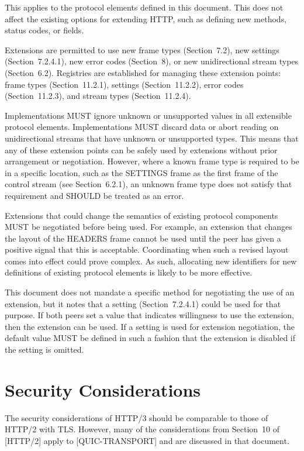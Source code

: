 \documentclass{article}
\begin{document}
This applies to the protocol elements defined in this document.  This does not affect the existing options for extending HTTP, such as defining new methods, status codes, or fields.

Extensions are permitted to use new frame types (Section~7.2), new settings (Section~7.2.4.1), new error codes (Section~8), or new unidirectional stream types (Section~6.2).  Registries are established for managing these extension points: frame types (Section~11.2.1), settings (Section~11.2.2), error codes (Section~11.2.3), and stream types (Section~11.2.4).

Implementations MUST ignore unknown or unsupported values in all extensible protocol elements.  Implementations MUST discard data or abort reading on unidirectional streams that have unknown or unsupported types.  This means that any of these extension points can be safely used by extensions without prior arrangement or negotiation.  However, where a known frame type is required to be in a specific location, such as the SETTINGS frame as the first frame of the control stream (see Section~6.2.1), an unknown frame type does not satisfy that requirement and SHOULD be treated as an error.

Extensions that could change the semantics of existing protocol components MUST be negotiated before being used.  For example, an extension that changes the layout of the HEADERS frame cannot be used until the peer has given a positive signal that this is acceptable. Coordinating when such a revised layout comes into effect could prove complex.  As such, allocating new identifiers for new definitions of existing protocol elements is likely to be more effective.

This document does not mandate a specific method for negotiating the use of an extension, but it notes that a setting (Section~7.2.4.1) could be used for that purpose.  If both peers set a value that indicates willingness to use the extension, then the extension can be used.  If a setting is used for extension negotiation, the default value MUST be defined in such a fashion that the extension is disabled if the setting is omitted.

\section{Security Considerations}

The security considerations of HTTP/3 should be comparable to those of HTTP/2 with TLS.  However, many of the considerations from Section~10 of [HTTP/2] apply to [QUIC-TRANSPORT] and are discussed in that document.
\end{document}
